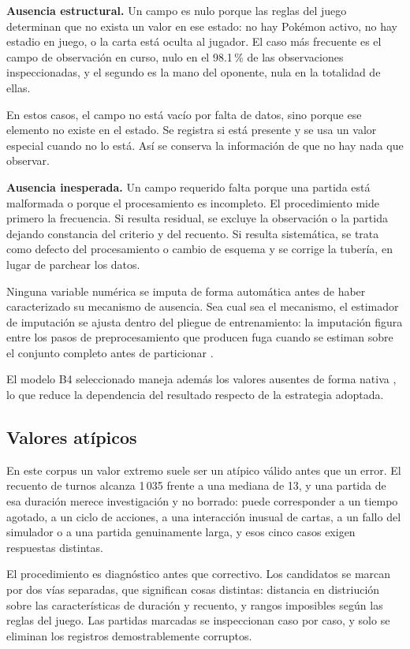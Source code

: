 \noindent\textbf{Ausencia estructural.} Un campo es nulo porque las reglas
del juego determinan que no exista un valor en ese estado: no hay Pok\'emon
activo, no hay estadio en juego, o la carta está oculta al jugador. El caso
más frecuente es el campo de observación en curso, nulo en el 98.1\,\% de
las observaciones inspeccionadas, y el segundo es la mano del oponente, nula
en la totalidad de ellas.

En estos casos, el campo no está vacío por falta de datos, sino porque ese
elemento no existe en el estado. Se registra si está presente y se usa un
valor especial cuando no lo está. Así se conserva la información de que no
hay nada que observar.

\noindent\textbf{Ausencia inesperada.} Un campo requerido falta porque una
partida está malformada o porque el procesamiento es incompleto. El
procedimiento mide primero la frecuencia. Si resulta residual, se excluye la
observación o la partida dejando constancia del criterio y del recuento. Si
resulta sistemática, se trata como defecto del procesamiento o cambio de
esquema y se corrige la tubería, en lugar de parchear los datos.

Ninguna variable numérica se imputa de forma automática antes de haber
caracterizado su mecanismo de ausencia. Sea cual sea el mecanismo, el
estimador de imputación se ajusta dentro del pliegue de entrenamiento: la
imputación figura entre los pasos de preprocesamiento que producen fuga
cuando se estiman sobre el conjunto completo antes de particionar
\cite{sasse_leakage_2025}.

El modelo B4 seleccionado maneja además los valores ausentes de forma nativa
\cite{borisov_tabular_2024}, lo que reduce la dependencia del resultado
respecto de la estrategia adoptada.

\subsection{Valores atípicos}
\label{subsec:atipicos}

En este corpus un valor extremo suele ser un atípico válido antes que un
error. El recuento de turnos alcanza 1\,035 frente a una mediana de 13, y
una partida de esa duración merece investigación y no borrado: puede
corresponder a un tiempo agotado, a un ciclo de acciones, a una interacción
inusual de cartas, a un fallo del simulador o a una partida genuinamente
larga, y esos cinco casos exigen respuestas distintas.

El procedimiento es diagnóstico antes que correctivo. Los candidatos se
marcan por dos vías separadas, que significan cosas distintas: distancia
en distriución sobre las características de duración y recuento, y rangos
imposibles según las reglas del juego. Las partidas marcadas se inspeccionan
caso por caso, y solo se eliminan los registros demostrablemente corruptos.

